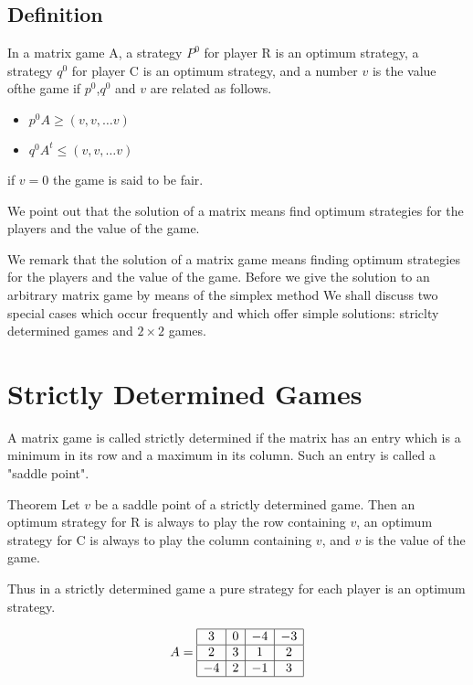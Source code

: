 \documentclass[]{report}
\begin{document}
\subsection{Definition}
In a matrix game A, a strategy $P^0$ for player R is an optimum strategy, a strategy $q^0$ for player C is an optimum strategy, and
a number $v$ is the value ofthe game if $p^0$,$q^0$ and $v$ are related as follows.
\begin{itemize}
\item $p^0A \geq (v,v,\ldots v)$
\item $q^0A^t \leq (v,v,\ldots v)$
\end{itemize}
if $v = 0$ the game is said to be fair.

We point out that  the solution of a matrix means find optimum strategies for the players and the value of the game.

We remark that the solution of a matrix game means finding optimum strategies for the players and the value of the game.
Before we give the solution to an arbitrary matrix game by means of the simplex method
We shall discuss two special cases which occur frequently and which offer simple solutions: striclty determined games and $2 \times 2$ games.

\section{Strictly Determined Games}

A matrix game is called strictly determined if the matrix has an entry which is a minimum in its row and a maximum in its column.
Such an entry is called a "saddle point".

Theorem Let $v$ be a saddle point of a strictly determined game. Then an optimum strategy for R is always to play the row 
containing $v$, an optimum strategy for C is always to play the column containing $v$, and $v$ is the value of the game.

Thus in a strictly determined game a pure strategy for each player is an optimum strategy.

\[
A = 
\begin{array}{|c|c|c|c|} \hline
3 & 0 & -4 & -3 \\ \hline 
2 & 3 & 1 & 2 \\ \hline
-4 & 2 & -1 & 3 \\ \hline
\end{array}
\]
\end{document}
